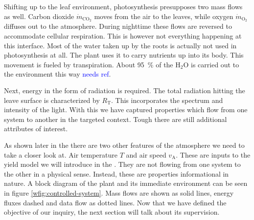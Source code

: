 Shifting up to the leaf environment, photosynthesis presupposes two mass flows as well.
Carbon dioxide $\dot{m}_{\text{CO}_2}$ moves from the air to the leaves, while oxygen $\dot{m}_{\text{O}_2}$ diffuses out to the atmosphere.
During nighttime these flows are reversed to accommodate cellular respiration.
This is however not everything happening at this interface.
Most of the water taken up by the roots is actually not used in photosynthesis at all.
The plant uses it to carry nutrients up into its body.
This movement is fueled by transpiration.
About \SI{95}{\percent} of the $\text{H}_2\text{O}$ is carried out to the environment this way \textcolor{Blue}{needs ref}.

Next, energy in the form of radiation is required.
The total radiation hitting the leave surface is characterized by $R_\text{T}$.
This incorporates the spectrum and intensity of the light.
With this we have captured properties which flow from one system to another in the targeted context.
Tough there are still additional attributes of interest.

As shown later in the  there are two other features of the atmosphere we need to take a closer look at.
Air temperature $T$ and air speed $v_\text{A}$.
These are inputs to the yield model we will introduce in the .
They are not flowing from one system to the other in a physical sense. %
Instead, these are properties informational in nature.
A block diagram of the plant and its immediate environment can be seen in figure \ref{wfig:controlled-system}.
Mass flows are shown as solid lines, energy fluxes dashed and data flow as dotted lines.
Now that we have defined the objective of our inquiry, the next section will talk about its supervision.


